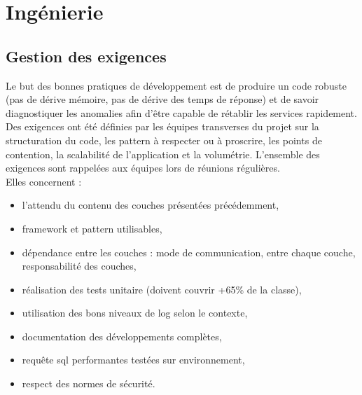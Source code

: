 \documentclass[12pt,a4paper]{article}
\begin{document}
\section{Ingénierie}
\subsection{Gestion des exigences}
Le but des bonnes pratiques de développement est de produire un code robuste (pas de dérive mémoire, pas de dérive des temps de réponse) et de savoir diagnostiquer les anomalies  afin d'être capable de rétablir les services rapidement.\\
Des exigences ont été définies par les équipes transverses du projet sur la structuration du code, les pattern à respecter ou à proscrire, les points de contention, la scalabilité de l'application et la volumétrie. L'ensemble des exigences sont rappelées aux équipes lors de réunions régulières.\\ Elles concernent :
\begin{itemize}	
\item l'attendu du contenu des couches présentées précédemment,
\item framework et pattern utilisables,
\item dépendance entre les couches : mode de communication, entre chaque couche, responsabilité des couches,
\item réalisation des tests unitaire (doivent couvrir +65\% de la classe),
\item utilisation des bons niveaux de log selon le contexte,
\item documentation des développements complètes,
\item requête sql performantes testées sur environnement,
\item respect des normes de sécurité.
\end{itemize}
\end{document}
